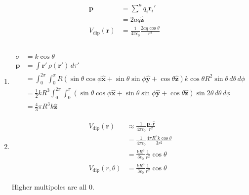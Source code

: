 \documentclass{article}
\renewcommand{\vec}[1]{\boldsymbol{\mathbf{#1}}}
\newcommand{\uvec}[1]{\hat{\vec{#1}}}
\newcommand{\ke}{\frac{1}{4 \pi \epsilon_0}}
\begin{document}
\subsection{}

\begin{align*}
  \vec{p}               & = \sum^n q_i \vec{r}_i'             \\
                        & = 2 a q \uvec{z}                    \\
  V_\text{dip}(\vec{r}) & = \ke \frac{2 a q \cos \theta}{r^2}
\end{align*}

\subsection{}

\begin{enumerate}
  \item

        \begin{align*}
          \sigma  & = k \cos \theta                                                                                                                                                          \\
          \vec{p} & = \int \vec{r}' \,\rho(\vec{r}') \,d \tau'                                                                                                                               \\
                  & = \int_0^{2 \pi} \int_0^\pi R (\sin \theta \cos \phi \uvec{x} + \sin \theta \sin \phi \uvec{y} + \cos \theta \uvec{z}) k \cos \theta R^2 \sin \theta \,d \theta \,d \phi \\
                  & = \frac{1}{2} k R^3 \int_0^{2 \pi} \int_0^\pi (\sin \theta \cos \phi \uvec{x} + \sin \theta \sin \phi \uvec{y} + \cos \theta \uvec{z}) \sin 2 \theta \,d \theta \,d \phi \\
                  & = \frac{4}{3} \pi R^3 k \uvec{z}
        \end{align*}

  \item

        \begin{align*}
          V_\text{dip}(\vec{r})   & \approx \ke \frac{\vec{p} \cdot \uvec{r}}{r^2}         \\
                                  & = \ke \frac{4 \pi R^3 k \cos \theta}{3 r^2}            \\
                                  & = \frac{k R^3}{3 \epsilon_0} \frac{1}{r^2} \cos \theta \\
          V_\text{dip}(r, \theta) & = \frac{k R^3}{3 \epsilon_0} \frac{1}{r^2} \cos \theta
        \end{align*}

        Higher multipoles are all $0$.
\end{enumerate}
\end{document}
